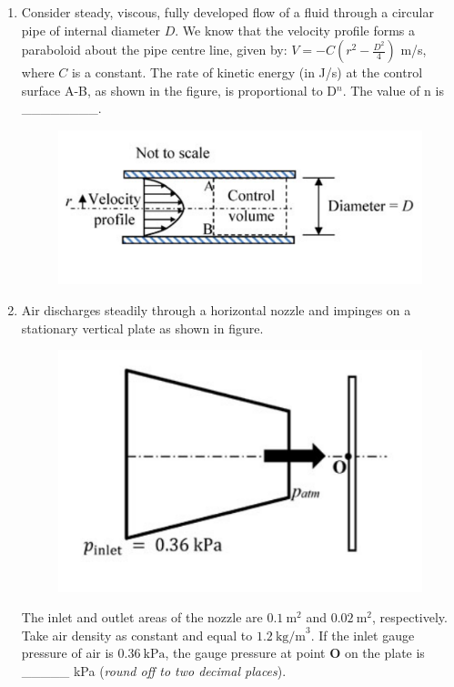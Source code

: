 \documentclass[12pt,onecolumn]{article}
\begin{document}
\begin{enumerate}
    \item Consider steady, viscous, fully developed flow of a fluid through a circular pipe of internal diameter $D$. We know that the velocity profile forms a paraboloid about the pipe centre line, given by: $V=-C\left(r^2-\frac{D^2}{4}\right)$ m/s, where $C$ is a constant. The rate of kinetic energy (in J/s) at the control surface A-B, as shown in the figure, is proportional to D$^n$. The value of n is \_\_\_\_\_\_\_\_.
          \begin{figure}[H]
              \centering
              \includegraphics[scale=0.5]{q49}
              \label{fig:q49}
          \end{figure}

    \item Air discharges steadily through a horizontal nozzle and impinges on a stationary vertical plate as shown in figure.
          \begin{figure}[H]
              \centering
              \includegraphics[scale=0.5]{q50}
              \label{fig:q50}
          \end{figure}
          The inlet and outlet areas of the nozzle are $0.1~\text{m}^2$ and $0.02~\text{m}^2$, respectively. Take air density as constant and equal to $1.2~\text{kg/m}^3$. If the inlet gauge pressure of air is $0.36~\text{kPa}$, the gauge pressure at point \textbf{O} on the plate is \_\_\_\_\_ kPa (\textit{round off to two decimal places}).


\end{enumerate}
\end{document}
